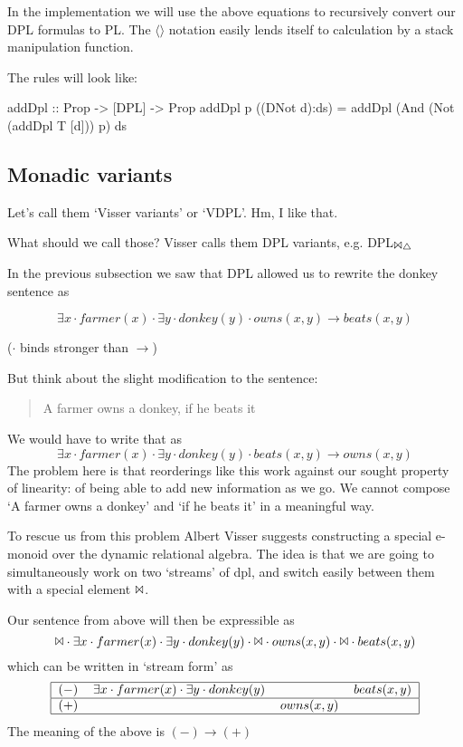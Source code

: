 \documentclass[12pt]{article}
\begin{document}
In the implementation we will use the above equations to recursively convert our DPL formulas to PL. The $\langle\rangle$ notation easily lends itself to calculation by a stack manipulation function.

The rules will look like:
\begin{haskell}
addDpl :: Prop -> [DPL] -> Prop
addDpl p ((DNot d):ds) = addDpl (And (Not (addDpl T [d])) p) ds
\end{haskell}


\subsection{Monadic variants}

Let's call them `Visser variants' or `VDPL'. Hm, I like that.

What should we call those? Visser calls them DPL variants, e.g. DPL$_{\Bowtie\triangle}$

In the previous subsection we saw that DPL allowed us to rewrite the donkey sentence as 

\begin{equation}
\exists x \cdot farmer(x) \cdot \exists y \cdot donkey(y) \cdot owns(x,y) \rightarrow beats(x,y)
\end{equation}

($\cdot$ binds stronger than $\rightarrow$)

But think about the slight modification to the sentence:
%
\begin{quotation}
A farmer owns a donkey, if he beats it
\end{quotation}
%
We would have to write that as
%
\begin{equation}
\exists x \cdot farmer(x) \cdot \exists y \cdot donkey(y) \cdot beats(x,y) \rightarrow owns(x,y)
\end{equation}
%
The problem here is that reorderings like this work against our sought property of linearity: of being able to add new information as we go. We cannot compose `A farmer owns a donkey' and `if he beats it' in a meaningful way.

To rescue us from this problem Albert Visser suggests constructing a special e-monoid over the dynamic relational algebra. The idea is that we are going to simultaneously work on two `streams' of dpl, and switch easily between them with a special element $\Bowtie$.

Our sentence from above will then be expressible as
%
\begin{equation}
\Bowtie \cdot \exists x \cdot farmer(x) \cdot \exists y \cdot donkey(y) \cdot \Bowtie \cdot owns(x,y) \cdot \Bowtie \cdot beats(x,y)
\end{equation}
%
which can be written in `stream form' as
%
\begin{equation}
\begin{tabular}{|clll|}
    \hline
    $(-)$ & $\exists x \cdot farmer(x) \cdot \exists y \cdot donkey(y)$ & ~ & $beats(x,y)$ \\\hline
    $(+)$ & ~ & $owns(x,y)$ & ~ \\\hline
\end{tabular}
\end{equation}
%
The meaning of the above is $(-) \rightarrow (+)$
\end{document}
